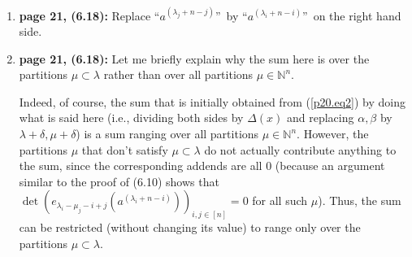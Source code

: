 \documentclass[numbers=enddot,12pt,final,onecolumn,notitlepage]{scrartcl}%
\theoremstyle{definition}
\let\sumnonlimits\sum
\renewcommand{\sum}{\sumnonlimits\limits}
\begin{document}
\begin{enumerate}
\begin{align*}
{{}}_{\substack{=\left(  x_{i}^{\beta_{k}}\right)  _{i,k\in\left[  n\right]
}\\=\left(  x_{i}^{\beta_{k}}\right)  _{1\leq i,k\leq n}}}\cdot\det
\underbrace{\left(  e_{\alpha_{j}-\beta_{i}}\left(  a^{\left(  \alpha
_{j}\right)  }\right)  \right)  _{i,j\in\left[  n\right]  }}%
_{\substack{=\left(  e_{\alpha_{j}-\beta_{k}}\left(  a^{\left(  \alpha
_{j}\right)  }\right)  \right)  _{k,j\in\left[  n\right]  }\\=\left(
e_{\alpha_{j}-\beta_{k}}\left(  a^{\left(  \alpha_{j}\right)  }\right)
\right)  _{1\leq k,j\leq n}}}\\
&  =\sum_{\beta_{1}>\beta_{2}>\cdots>\beta_{n}\geq0}\det\left(  x_{i}%
^{\beta_{k}}\right)  _{1\leq i,k\leq n}\det\left(  e_{\alpha_{j}-\beta_{k}%
}\left(  a^{\left(  \alpha_{j}\right)  }\right)  \right)  _{1\leq k,j\leq n}.
\end{align*}
In view of (\ref{p21.UV=}), we can rewrite this as%
\begin{align*}
&  \det\left(  \sum_{k\geq0}x_{i}^{k}e_{\alpha_{j}-k}\left(  a^{\left(
\alpha_{j}\right)  }\right)  \right)  _{1\leq i,j\leq n}\\
&  =\sum_{\beta_{1}>\beta_{2}>\cdots>\beta_{n}\geq0}\det\left(  x_{i}%
^{\beta_{k}}\right)  _{1\leq i,k\leq n}\det\left(  e_{\alpha_{j}-\beta_{k}%
}\left(  a^{\left(  \alpha_{j}\right)  }\right)  \right)  _{1\leq k,j\leq n}.
\end{align*}
This proves the second equality sign in (\ref{p20.eq2}).

\item \textbf{page 21, (6.18):} Replace \textquotedblleft$a^{\left(
\lambda_{j}+n-j\right)  }$\textquotedblright\ by \textquotedblleft$a^{\left(
\lambda_{i}+n-i\right)  }$\textquotedblright\ on the right hand side.

\item \textbf{page 21, (6.18):} Let me briefly explain why the sum here is
over the partitions $\mu\subset\lambda$ rather than over all partitions
$\mu\in\mathbb{N}^{n}$.

Indeed, of course, the sum that is initially obtained from (\ref{p20.eq2}) by
doing what is said here (i.e., dividing both sides by $\Delta\left(  x\right)
$ and replacing $\alpha,\beta$ by $\lambda+\delta,\mu+\delta$) is a sum
ranging over all partitions $\mu\in\mathbb{N}^{n}$. However, the partitions
$\mu$ that don't satisfy $\mu\subset\lambda$ do not actually contribute
anything to the sum, since the corresponding addends are all $0$ (because an
argument similar to the proof of (6.10) shows that $\det\left(  e_{\lambda
_{i}-\mu_{j}-i+j}\left(  a^{\left(  \lambda_{i}+n-i\right)  }\right)  \right)
_{i,j\in\left[  n\right]  }=0$ for all such $\mu$). Thus, the sum can be
restricted (without changing its value) to range only over the partitions
$\mu\subset\lambda$.


\end{enumerate}
\end{document}
